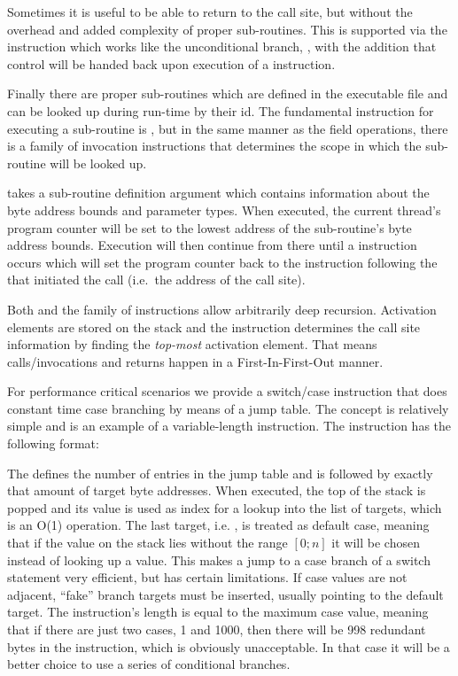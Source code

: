 Sometimes it is useful to be able to return to the call site, but without the
overhead and added complexity of proper sub-routines. This is supported via the
 instruction which works like the unconditional branch, ,
with the addition that control will be handed back upon execution of a
 instruction.

Finally there are proper sub-routines which are defined in the executable file
and can be looked up during run-time by their id. The fundamental instruction
for executing a sub-routine is , but in the same manner as the
field operations, there is a family of invocation instructions that determines
the scope in which the sub-routine will be looked up.

 takes a sub-routine definition argument which contains
information about the byte address bounds and parameter types. When executed,
the current thread's program counter will be set to the lowest address of the
sub-routine's byte address bounds. Execution will then continue from there until
a  instruction occurs which will set the program counter back to
the instruction following the  that initiated the call (i.e.~the
address of the call site).

Both  and the  family of instructions allow
arbitrarily deep recursion. Activation elements are stored on the stack and the
 instruction determines the call site information by finding the
\emph{top-most} activation element. That means calls/invocations and returns
happen in a First-In-First-Out manner.

For performance critical scenarios we provide a switch/case instruction that
does constant time case branching by means of a jump table. The concept is
relatively simple and is an example of a variable-length instruction. The
 instruction has the following format:


The  defines the number of entries in the jump table and is
followed by exactly that amount of target byte addresses. When executed, the top
of the stack is popped and its value is used as index for a lookup into the list
of targets, which is an O(1) operation. The last target, i.e. ,
is treated as default case, meaning that if the value on the stack lies without
the range $[0;n]$ it will be chosen instead of looking up a value. This makes a
jump to a case branch of a switch statement very efficient, but has certain
limitations. If case values are not adjacent, ``fake'' branch targets must be
inserted, usually pointing to the default target. The instruction's length is
equal to the maximum case value, meaning that if there are just two cases, 1 and
1000, then there will be 998 redundant bytes in the instruction, which is
obviously unacceptable. In that case it will be a better choice to use a series
of conditional branches.

